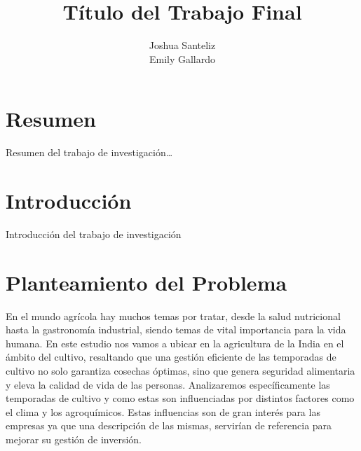 \documentclass[oneside,11pt]{Latex/Classes/PhDthesisPSnPDF}
\title{Título del Trabajo Final}
\author{Joshua Santeliz \\ Emily Gallardo}
\begin{document}
\maketitle

\frontmatter


\setcounter{secnumdepth}{3}
\setcounter{tocdepth}{3}

\tableofcontents



\cleardoublepage

  \cleardoublepage       %
  \chapter*{Resumen}     %
  
  Resumen del trabajo de
investigación\ldots{}             %
  
  \cleardoublepage

\mainmatter
\def\baselinestretch{1.5}

\chapter*{Introducción}

Introducción del trabajo de investigación

\chapter{Planteamiento del Problema}

En el mundo agrícola hay muchos temas por tratar, desde la salud
nutricional hasta la gastronomía industrial, siendo temas de vital
importancia para la vida humana. En este estudio nos vamos a ubicar en
la agricultura de la India en el ámbito del cultivo, resaltando que una
gestión eficiente de las temporadas de cultivo no solo garantiza
cosechas óptimas, sino que genera seguridad alimentaria y eleva la
calidad de vida de las personas. Analizaremos específicamente las
temporadas de cultivo y como estas son influenciadas por distintos
factores como el clima y los agroquímicos. Estas influencias son de gran
interés para las empresas ya que una descripción de las mismas,
servirían de referencia para mejorar su gestión de inversión.\\
\end{document}
